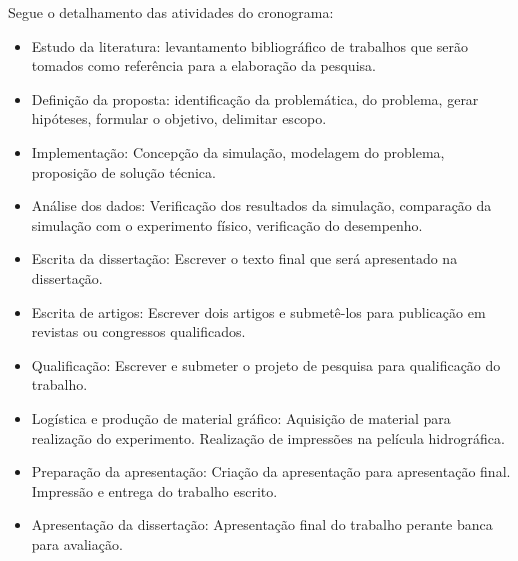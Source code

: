 Segue o detalhamento das atividades do cronograma:
\begin{itemize}
\item Estudo da literatura: levantamento bibliográfico de trabalhos que serão tomados como referência para a elaboração da pesquisa.
\item Definição da proposta: identificação da problemática, do problema, gerar hipóteses, formular o objetivo, delimitar escopo.
\item Implementação: Concepção da simulação, modelagem do problema, proposição de solução técnica.
\item Análise dos dados: Verificação dos resultados da simulação, comparação da simulação com o experimento físico, verificação do desempenho.
\item Escrita da dissertação: Escrever o texto final que será apresentado na dissertação.
\item Escrita de artigos: Escrever dois artigos e submetê-los para publicação em revistas ou congressos qualificados.
\item Qualificação: Escrever e submeter o projeto de pesquisa para qualificação do trabalho.
\item Logística e produção de material gráfico: Aquisição de material para realização do experimento. Realização de impressões na película hidrográfica.
\item Preparação da apresentação: Criação da apresentação para apresentação final. Impressão e entrega do trabalho escrito.
\item Apresentação da dissertação: Apresentação final do trabalho perante banca para avaliação.

\end{itemize}